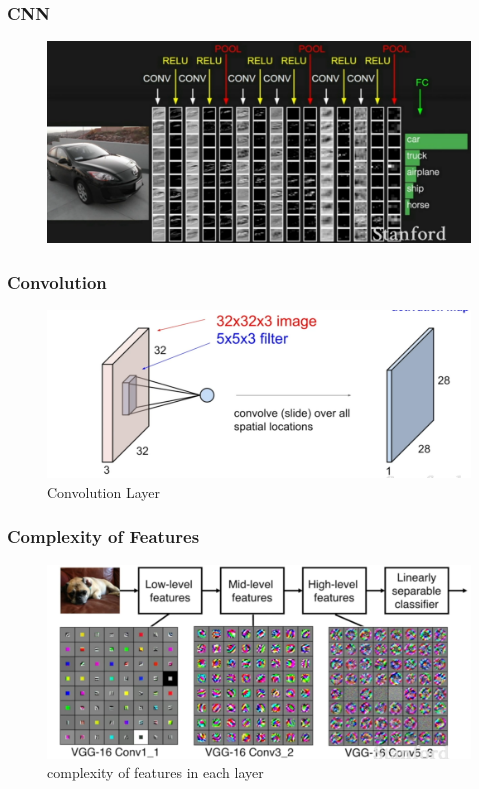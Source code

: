 \documentclass{beamer}
\begin{document}
\begin{frame}
\frametitle{CNN}

	\begin{figure}
		\includegraphics[width=\linewidth]{Pics/cexample.png}
	\end{figure}

\end{frame}
\begin{frame}
\frametitle{Convolution}

\begin{figure}
	\includegraphics[width=\linewidth]{Pics/cnlayer.png}
	\caption{Convolution Layer}
\end{figure}

\end{frame}

\begin{frame}
\frametitle{Complexity of Features}

\begin{figure}
	\includegraphics[width=\linewidth]{Pics/hlayer.png}
	\caption{complexity of features in each layer}
\end{figure}
\end{frame}
\end{document}
